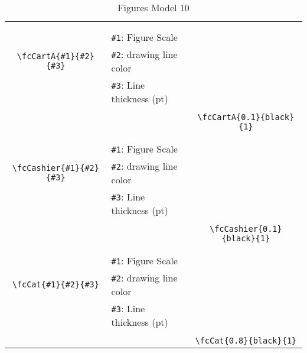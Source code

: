 \documentclass[x11names]{article}
\begin{document}
\begin{table}[H]
\begin{tabular}{|c|l|c|}
	&&\multirow{5}{*}{\fcCartA{0.1}{black}{1}}\\	&&\\	&\verb|#1|: Figure Scale &\\	\verb|\fcCartA{#1}{#2}{#3}|&	\verb|#2|: drawing line color &\\	&\verb|#3|: Line thickness (pt) &\\ &&\\&&	\verb|\fcCartA{0.1}{black}{1}|\\\hline 	
	&&\multirow{5}{*}{\fcCashier{0.1}{black}{1}}\\	&&\\	&\verb|#1|: Figure Scale &\\	\verb|\fcCashier{#1}{#2}{#3}|&	\verb|#2|: drawing line color &\\	&\verb|#3|: Line thickness (pt) &\\ &&\\&&	\verb|\fcCashier{0.1}{black}{1}|\\\hline 	
	&&\multirow{5}{*}{\fcCat{0.8}{black}{1}}\\	&&\\	&\verb|#1|: Figure Scale &\\	\verb|\fcCat{#1}{#2}{#3}|&	\verb|#2|: drawing line color &\\	&\verb|#3|: Line thickness (pt) &\\ &&\\&&	\verb|\fcCat{0.8}{black}{1}|\\\hline 	\hline\end{tabular}\caption{Figures Model 10}\label{tab10}\end{table}
\end{document}
